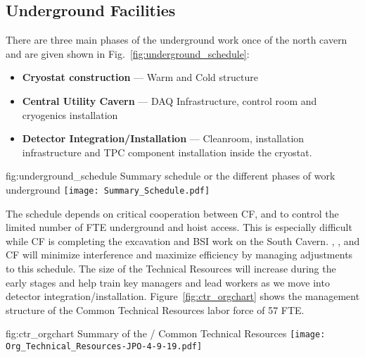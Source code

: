 \subsection{Underground Facilities}


There are three main phases of the underground work once 
of the north cavern and  are given shown in
Fig.~\ref{fig:underground_schedule}:
\begin{itemize}
 \item {\bf Cryostat construction} --- Warm and Cold structure
 \item {\bf Central Utility Cavern} --- DAQ Infrastructure, control room
   and cryogenics installation
 \item {\bf Detector Integration/Installation} --- Cleanroom, installation
   infrastructure and TPC component installation inside the cryostat.
\end{itemize}
\begin{dunefigure}{fig:underground_schedule}
  {Summary schedule or the different phases of work underground}
  \texttt{[image: Summary\_Schedule.pdf]}
\end{dunefigure}


The schedule depends on critical cooperation between CF, 
and  to control the limited number of FTE underground and
hoist access.  This is especially difficult while CF is completing the
excavation and BSI work on the South Cavern.  ,
,  and CF will minimize interference and
maximize efficiency by managing adjustments to this schedule.  The
size of the Technical Resources will increase during the early stages
and help train key managers and lead workers as we move into detector
integration/installation.  Figure~\ref{fig:ctr_orgchart} shows the
management structure of the Common Technical Resources labor force of
57 FTE.
\begin{dunefigure}{fig:ctr_orgchart}
  {Summary of the / Common Technical Resources}
  \texttt{[image: Org\_Technical\_Resources-JPO-4-9-19.pdf]}
\end{dunefigure}

